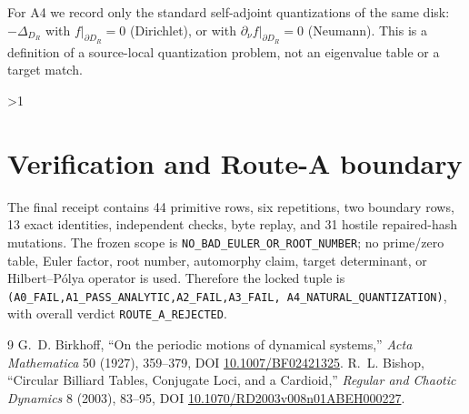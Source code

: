 \documentclass[10pt]{article}
\begin{document}
For A4 we record only the standard self-adjoint quantizations of the same disk:
\(-\Delta_{D_R}\) with \(f|_{\partial D_R}=0\) (Dirichlet), or with
\(\partial_\nu f|_{\partial D_R}=0\) (Neumann).  This is a definition of a
source-local quantization problem, not an eigenvalue table or a target match.

\ifnum\CRevisionRound>1
\section{Verification and Route-A boundary}
The final receipt contains 44 primitive rows, six repetitions, two boundary
rows, 13 exact identities, independent checks, byte replay, and 31 hostile
repaired-hash mutations.  The frozen scope is
\texttt{NO\_BAD\_EULER\_OR\_ROOT\_NUMBER}; no prime/zero table, Euler factor,
root number, automorphy claim, target determinant, or Hilbert--Pólya operator
is used.  Therefore the locked tuple is
\texttt{(A0\_FAIL,A1\_PASS\_ANALYTIC,A2\_FAIL,A3\_FAIL,
A4\_NATURAL\_QUANTIZATION)},
with overall verdict \texttt{ROUTE\_A\_REJECTED}.
\fi

\begin{thebibliography}{9}
 G.~D. Birkhoff, ``On the periodic motions of dynamical
systems,'' \emph{Acta Mathematica} 50 (1927), 359--379, DOI
\href{https://doi.org/10.1007/BF02421325}{10.1007/BF02421325}.
 R.~L. Bishop, ``Circular Billiard Tables, Conjugate Loci,
and a Cardioid,'' \emph{Regular and Chaotic Dynamics} 8 (2003), 83--95,
DOI \href{https://doi.org/10.1070/RD2003v008n01ABEH000227}
{10.1070/RD2003v008n01ABEH000227}.
\end{thebibliography}
\end{document}
